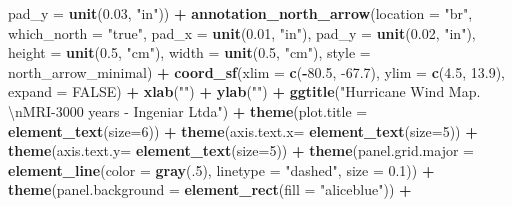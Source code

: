 \documentclass[12pt,twoside]{reedthesis}
\newenvironment{Shaded}{\begin{snugshade}}{\end{snugshade}}
\newcommand{\CharTok}[1]{\textcolor[rgb]{0.31,0.60,0.02}{#1}}
\newcommand{\DataTypeTok}[1]{\textcolor[rgb]{0.13,0.29,0.53}{#1}}
\newcommand{\DecValTok}[1]{\textcolor[rgb]{0.00,0.00,0.81}{#1}}
\newcommand{\FloatTok}[1]{\textcolor[rgb]{0.00,0.00,0.81}{#1}}
\newcommand{\KeywordTok}[1]{\textcolor[rgb]{0.13,0.29,0.53}{\textbf{#1}}}
\newcommand{\NormalTok}[1]{#1}
\newcommand{\OperatorTok}[1]{\textcolor[rgb]{0.81,0.36,0.00}{\textbf{#1}}}
\newcommand{\OtherTok}[1]{\textcolor[rgb]{0.56,0.35,0.01}{#1}}
\newcommand{\StringTok}[1]{\textcolor[rgb]{0.31,0.60,0.02}{#1}}
\begin{document}
\begin{Shaded}
\begin{Highlighting}[]
   \DataTypeTok{pad_y =} \KeywordTok{unit}\NormalTok{(}\FloatTok{0.03}\NormalTok{, }\StringTok{"in"}\NormalTok{)) }\OperatorTok{+}\StringTok{ }
\StringTok{  }\KeywordTok{annotation_north_arrow}\NormalTok{(}\DataTypeTok{location =} \StringTok{"br"}\NormalTok{, }\DataTypeTok{which_north =} \StringTok{"true"}\NormalTok{, }\DataTypeTok{pad_x =} \KeywordTok{unit}\NormalTok{(}\FloatTok{0.01}\NormalTok{, }\StringTok{"in"}\NormalTok{), }\DataTypeTok{pad_y =} \KeywordTok{unit}\NormalTok{(}\FloatTok{0.02}\NormalTok{, }\StringTok{"in"}\NormalTok{), }\DataTypeTok{height =} \KeywordTok{unit}\NormalTok{(}\FloatTok{0.5}\NormalTok{, }\StringTok{"cm"}\NormalTok{), }
   \DataTypeTok{width =} \KeywordTok{unit}\NormalTok{(}\FloatTok{0.5}\NormalTok{, }\StringTok{"cm"}\NormalTok{), }\DataTypeTok{style =}\NormalTok{ north_arrow_minimal) }\OperatorTok{+}
\StringTok{  }\KeywordTok{coord_sf}\NormalTok{(}\DataTypeTok{xlim =} \KeywordTok{c}\NormalTok{(}\OperatorTok{-}\FloatTok{80.5}\NormalTok{, }\FloatTok{-67.7}\NormalTok{), }\DataTypeTok{ylim =} \KeywordTok{c}\NormalTok{(}\FloatTok{4.5}\NormalTok{, }\FloatTok{13.9}\NormalTok{), }\DataTypeTok{expand =} \OtherTok{FALSE}\NormalTok{) }\OperatorTok{+}
\StringTok{  }\KeywordTok{xlab}\NormalTok{(}\StringTok{""}\NormalTok{) }\OperatorTok{+}\StringTok{ }
\StringTok{  }\KeywordTok{ylab}\NormalTok{(}\StringTok{""}\NormalTok{) }\OperatorTok{+}\StringTok{ }
\StringTok{  }\KeywordTok{ggtitle}\NormalTok{(}\StringTok{"Hurricane Wind Map. }\CharTok{\textbackslash{}n}\StringTok{MRI-3000 years - Ingeniar Ltda"}\NormalTok{) }\OperatorTok{+}\StringTok{ }
\StringTok{  }\KeywordTok{theme}\NormalTok{(}\DataTypeTok{plot.title =} \KeywordTok{element_text}\NormalTok{(}\DataTypeTok{size=}\DecValTok{6}\NormalTok{)) }\OperatorTok{+}
\StringTok{  }\KeywordTok{theme}\NormalTok{(}\DataTypeTok{axis.text.x=} \KeywordTok{element_text}\NormalTok{(}\DataTypeTok{size=}\DecValTok{5}\NormalTok{)) }\OperatorTok{+}\StringTok{ }
\StringTok{  }\KeywordTok{theme}\NormalTok{(}\DataTypeTok{axis.text.y=} \KeywordTok{element_text}\NormalTok{(}\DataTypeTok{size=}\DecValTok{5}\NormalTok{)) }\OperatorTok{+}
\StringTok{  }\KeywordTok{theme}\NormalTok{(}\DataTypeTok{panel.grid.major =} \KeywordTok{element_line}\NormalTok{(}\DataTypeTok{color =} \KeywordTok{gray}\NormalTok{(.}\DecValTok{5}\NormalTok{), }\DataTypeTok{linetype =} \StringTok{"dashed"}\NormalTok{, }\DataTypeTok{size =} \FloatTok{0.1}\NormalTok{)) }\OperatorTok{+}
\StringTok{  }\KeywordTok{theme}\NormalTok{(}\DataTypeTok{panel.background =} \KeywordTok{element_rect}\NormalTok{(}\DataTypeTok{fill =} \StringTok{"aliceblue"}\NormalTok{)) }\OperatorTok{+}

\end{Highlighting}
\end{Shaded}
\end{document}
